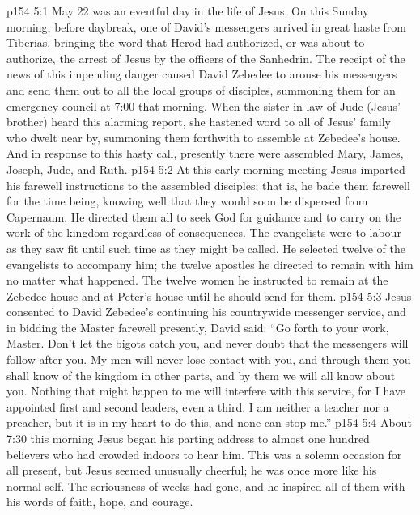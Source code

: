 \vs p154 5:1 May 22 was an eventful day in the life of Jesus. On this Sunday morning, before daybreak, one of David’s messengers arrived in great haste from Tiberias, bringing the word that Herod had authorized, or was about to authorize, the arrest of Jesus by the officers of the Sanhedrin. The receipt of the news of this impending danger caused David Zebedee to arouse his messengers and send them out to all the local groups of disciples, summoning them for an emergency council at 7:00 that morning. When the sister\hyp{}in\hyp{}law of Jude (Jesus’ brother) heard this alarming report, she hastened word to all of Jesus’ family who dwelt near by, summoning them forthwith to assemble at Zebedee’s house. And in response to this hasty call, presently there were assembled Mary, James, Joseph, Jude, and Ruth.
\vs p154 5:2 At this early morning meeting Jesus imparted his farewell instructions to the assembled disciples; that is, he bade them farewell for the time being, knowing well that they would soon be dispersed from Capernaum. He directed them all to seek God for guidance and to carry on the work of the kingdom regardless of consequences. The evangelists were to labour as they saw fit until such time as they might be called. He selected twelve of the evangelists to accompany him; the twelve apostles he directed to remain with him no matter what happened. The twelve women he instructed to remain at the Zebedee house and at Peter’s house until he should send for them.
\vs p154 5:3 Jesus consented to David Zebedee’s continuing his countrywide messenger service, and in bidding the Master farewell presently, David said: “Go forth to your work, Master. Don’t let the bigots catch you, and never doubt that the messengers will follow after you. My men will never lose contact with you, and through them you shall know of the kingdom in other parts, and by them we will all know about you. Nothing that might happen to me will interfere with this service, for I have appointed first and second leaders, even a third. I am neither a teacher nor a preacher, but it is in my heart to do this, and none can stop me.”
\vs p154 5:4 About 7:30 this morning Jesus began his parting address to almost one hundred believers who had crowded indoors to hear him. This was a solemn occasion for all present, but Jesus seemed unusually cheerful; he was once more like his normal self. The seriousness of weeks had gone, and he inspired all of them with his words of faith, hope, and courage.
